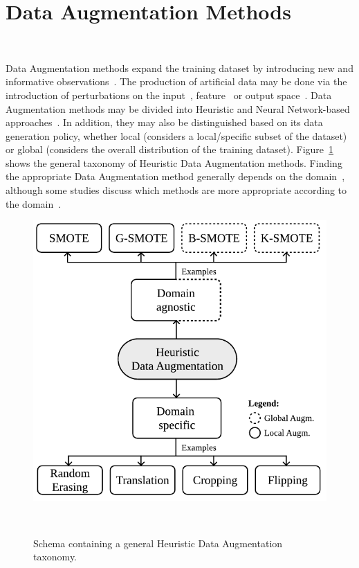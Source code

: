 \documentclass[preprint, 12pt]{elsarticle}
\begin{document}
\section{Data Augmentation Methods}~\label{sec:data_augmentation}

Data Augmentation methods expand the training dataset by introducing new and
informative observations~\cite{Behpour2019}. The production of artificial data
may be done via the introduction of perturbations on the
input~\cite{Zhong2020}, feature~\cite{DeVries2017} or output
space~\cite{Behpour2019}. Data Augmentation methods may be divided into
Heuristic and Neural Network-based approaches~\cite{Shorten2019}. In addition,
they may also be distinguished based on its data generation policy, whether
local (considers a local/specific subset of the dataset) or global (considers
the overall distribution of the training dataset).
Figure~\ref{fig:data_augmentation_taxonomy} shows the general taxonomy of
Heuristic Data Augmentation methods. Finding the appropriate Data Augmentation
method generally depends on the domain~\cite{DeVries2017}, although some
studies discuss which methods are more appropriate according to the
domain~\cite{Shorten2019, Iwana2021, Wong2016}.

\begin{figure}[H]
	\centering
	\includegraphics[width=.55\linewidth]{../analysis/data_augmentation_taxonomy}
    \caption{%
        Schema containing a general Heuristic Data Augmentation taxonomy.
    }~\label{fig:data_augmentation_taxonomy}
\end{figure}
\end{document}
